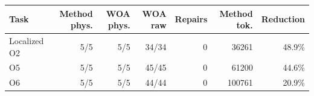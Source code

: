 \begin{tabular}{lrrrrrr}
\toprule
Task & Method phys. & WOA phys. & WOA raw & Repairs & Method tok. & Reduction \\
\midrule
Localized O2 & 5/5 & 5/5 & 34/34 & 0 & 36261 & 48.9\% \\
O5 & 5/5 & 5/5 & 45/45 & 0 & 61200 & 44.6\% \\
O6 & 5/5 & 5/5 & 44/44 & 0 & 100761 & 20.9\% \\
\bottomrule
\end{tabular}
